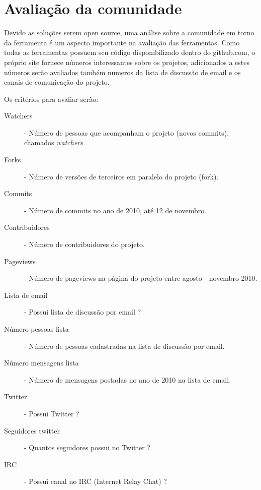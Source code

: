 \section{Avaliação da comunidade}

Devido as soluções serem open source, uma análise sobre a comunidade em torno da ferramenta é um aspecto importante na avaliação das ferramentas. Como todas as ferramentas possuem seu código disponibilizado dentro do github.com, o próprio site fornece números interessantes sobre os projetos, adicionados a estes números serão avaliados também numeros da lista de discussão de email e os canais de comunicação do projeto.

Os critérios para avaliar serão:

\begin{description}
    \item[Watchers] - Número de pessoas que acompanham o projeto (novos commits), chamados \emph{watchers}
    \item[Forks] - Número de versões de terceiros em paralelo do projeto (fork).
    \item[Commits] - Número de commits no ano de 2010, até 12 de novembro.
    \item[Contribuidores] - Número de contribuidores do projeto.
    \item[Pageviews] - Número de pageviews na página do projeto entre agosto - novembro 2010.
    \item[Lista de email] - Possui lista de discussão por email ?
    \item[Número pessoas lista] - Número de pessoas cadastradas na lista de discussão por email. 
    \item[Número mensagens lista] - Número de mensagens postadas no ano de 2010 na lista de email.
    \item[Twitter] - Possui Twitter ?
    \item[Seguidores twitter] - Quantos seguidores possui no Twitter ?
    \item[IRC] - Possui canal no IRC (Internet Relay Chat) ?
\end{description}




